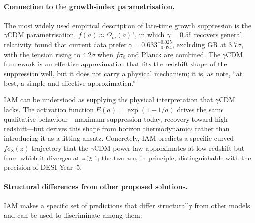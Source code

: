 \documentclass[12pt,a4paper]{article}
\begin{document}
\paragraph{Connection to the growth-index parametrisation.}
The most widely used empirical description of late-time growth suppression
is the $\gamma$CDM parametrisation, $f(a) \approx \Omega_m(a)^\gamma$,
in which $\gamma = 0.55$ recovers general relativity.
\citet{Nguyen2023} found that current data prefer $\gamma = 0.633^{+0.025}_{-0.024}$,
excluding GR at $3.7\sigma$, with the tension rising to $4.2\sigma$ when
$f\sigma_8$ and Planck are combined.
The $\gamma$CDM framework is an effective approximation that fits the
redshift shape of the suppression well, but it does not carry a physical
mechanism; it is, as \citet{Adil2023} note, ``at best, a simple and
effective approximation.''

IAM can be understood as supplying the physical interpretation that
$\gamma$CDM lacks.  The activation function $E(a) = \exp(1-1/a)$ drives
the same qualitative behaviour---maximum suppression today, recovery
toward high redshift---but derives this shape from horizon thermodynamics
rather than introducing it as a fitting ansatz.
Concretely, IAM predicts a specific curved $f\sigma_8(z)$ trajectory that
the $\gamma$CDM power law approximates at low redshift but from which it
diverges at $z \gtrsim 1$; the two are, in principle, distinguishable
with the precision of DESI Year~5.

\paragraph{Structural differences from other proposed solutions.}
IAM makes a specific set of predictions that differ structurally from other
models and can be used to discriminate among them:
\end{document}
